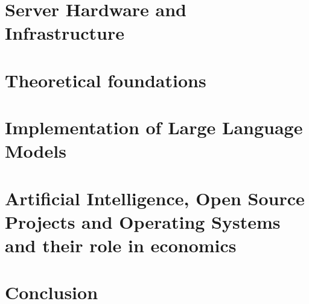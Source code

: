 \part{Server Hardware and Infrastructure}



\part{Theoretical foundations} %
%


%

\part{Implementation of Large Language Models}





%
%


\part{Artificial Intelligence, Open Source Projects and Operating Systems and their role in economics}

 


\part{Conclusion}
%





\appendix                       %







\listoffigures
\lstlistoflistings
\nocite{*}



